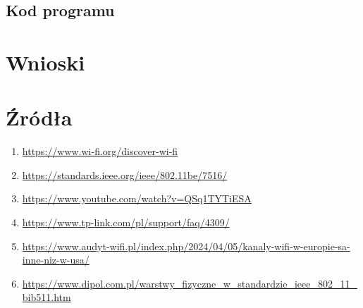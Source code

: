 \documentclass{article}
\begin{document}
        \subsection{Kod programu}
    \section{Wnioski}
    \section{Źródła}
        \begin{enumerate}[label=\arabic*.]
            \item \url{https://www.wi-fi.org/discover-wi-fi}
            \item \url{https://standards.ieee.org/ieee/802.11be/7516/}
            \item \url{https://www.youtube.com/watch?v=QSq1TYTiESA}
            \item \url{https://www.tp-link.com/pl/support/faq/4309/}
            \item \url{https://www.audyt-wifi.pl/index.php/2024/04/05/kanaly-wifi-w-europie-sa-inne-niz-w-usa/}
            \item \url{https://www.dipol.com.pl/warstwy_fizyczne_w_standardzie_ieee_802_11_bib511.htm}
        \end{enumerate}
\end{document}

